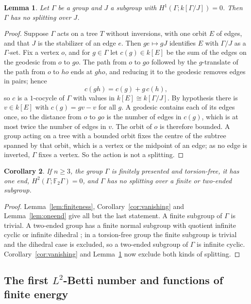 \documentclass[11pt,a4paper]{article}
\newtheorem{lemma}{Lemma}[section]
\newtheorem{corollary}[lemma]{Corollary}
\theoremstyle{definition}
\theoremstyle{remark}
\newcommand{\F}{\mathbb{F}}
\newcommand{\Gam}{\Gamma}
\begin{document}
\begin{lemma}\label{lem:nosplit}
Let $\Gam$ be a group and $J$ a subgroup with $H^1(\Gam;k[\Gam/J])=0$. Then $\Gam$ has no
splitting over $J$.
\end{lemma}
\begin{proof}
Suppose $\Gam$ acts on a tree $T$ without inversions, with one orbit $E$ of edges,
and that $J$ is the stabilizer of an edge $e$. Then $ge\mapsto gJ$ identifies $E$
with $\Gam/J$ as a $\Gam$-set. Fix a vertex $o$, and for $g\in\Gam$ let
$c(g)\in k[E]$ be the sum of the edges on the geodesic from $o$ to $go$. The path
from $o$ to $go$ followed by the $g$-translate of the path from $o$ to $ho$ ends
at $gho$, and reducing it to the geodesic removes edges in pairs; hence
\[
 c(gh)=c(g)+g\,c(h),
\]
so $c$ is a $1$-cocycle of $\Gam$ with values in $k[E]\cong k[\Gam/J]$. By hypothesis
there is $v\in k[E]$ with $c(g)=gv-v$ for all $g$. A geodesic contains each of its
edges once, so the distance from $o$ to $go$ is the number of edges in $c(g)$,
which is at most twice the number of edges in $v$. The orbit of $o$ is therefore
bounded. A group acting on a tree with a bounded orbit fixes the centre of the
subtree spanned by that orbit, which is a vertex or the midpoint of an edge; as
no edge is inverted, $\Gam$ fixes a vertex. So the action is not a splitting.
\end{proof}

\begin{corollary}\label{cor:group}
If $n\ge3$, the group $\Gam$ is finitely presented and torsion-free, it has one end,
$H^2(\Gam;\F_2\Gam)=0$, and $\Gam$ has no splitting over a finite or two-ended subgroup.
\end{corollary}
\begin{proof}
Lemma~\ref{lem:finiteness}, Corollary~\ref{cor:vanishing} and
Lemma~\ref{lem:oneend} give all but the last statement. A finite subgroup of $\Gam$
is trivial. A two-ended group has a finite normal subgroup with quotient infinite
cyclic or infinite dihedral \cite[Lemma~4.1]{W}; in a torsion-free group the
finite subgroup is trivial and the dihedral case is excluded, so a two-ended
subgroup of $\Gam$ is infinite cyclic. Corollary~\ref{cor:vanishing} and
Lemma~\ref{lem:nosplit} now exclude both kinds of splitting.
\end{proof}

\subsection{The first $L^2$-Betti number and functions of finite energy}
\end{document}
